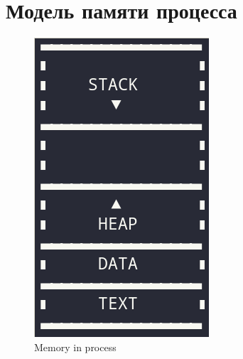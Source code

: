 \documentclass[../../lectures.tex]{subfiles}
\begin{document}
\section{Модель памяти процесса}
\begin{figure}[H]
\begin{minipage}[c]{0.25\linewidth}
\centering
\includegraphics[width=\textwidth]{images/memory.png}
\caption{Memory in process}
\end{minipage}
\hspace{0.5cm}
\begin{minipage}[c]{0.7\linewidth}

\end{minipage}
\end{figure}
\end{document}
